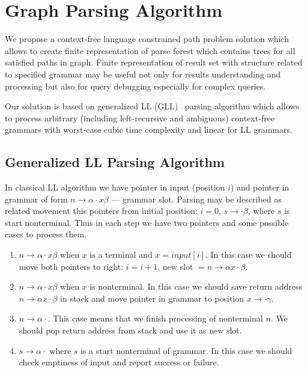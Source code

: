 \section{Graph Parsing Algorithm}

We propose a context-free language constrained path problem solution which allows to create finite representation of parse forest which contains trees for all satisfied paths in graph.
Finite representation of result set with structure related to specified grammar may be useful not only for results understanding and processing but also for query debugging especially for complex queries. 

Our solution is based on generalized LL (GLL)~\cite{scott2010gll, FastPracticalGLL} parsing algorithm which allows to process arbitrary (including left-recursive and ambiguous) context-free grammars with worst-case cubic time complexity and linear for LL grammars. 

\subsection{Generalized LL Parsing Algorithm}

In classical LL algorithm we have pointer in input (position $i$) and pointer in grammar of form $n \rightarrow \alpha \cdot x \beta $ --- grammar slot.
Parsing may be described as related movement this pointers from initial position: $i=0$, $s \rightarrow \cdot \beta $, where $s$ is start nonterminal. Thus in each step we have two pointers and some possible cases to process them. 

\begin{enumerate}
\item $n \rightarrow \alpha \cdot x \beta $ when $x$ is a terminal and $x = input[i]$. In this case we should move both pointers to right: $i = i + 1$, new slot $= n \rightarrow \alpha  x \cdot \beta $.
\item $n \rightarrow \alpha \cdot x \beta $ when $x$ is nonterminal. In this case we should save return address $n \rightarrow \alpha x \cdot \beta $ in stack and move pointer in grammar to position $x \rightarrow \cdot \gamma$.
\item $n \rightarrow \alpha \cdot $. This case means that we finish processing of nonterminal $n$. We should pop return address from stack and use it as new slot.
\item $s \rightarrow \alpha \cdot $ where $s$ is a start nonterminal of grammar. In this case we should check emptiness of input and report success or failure. 
\end{enumerate}

